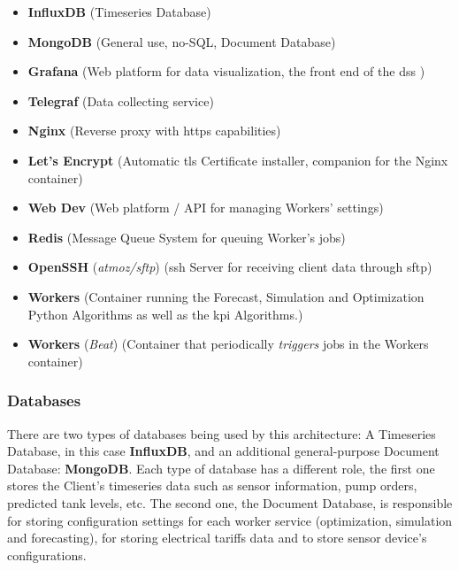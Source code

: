 \begin{itemize}

\item \textbf{InfluxDB} (Timeseries Database)
\item \textbf{MongoDB} (General use, no-SQL, Document Database)
\item \textbf{Grafana} (Web platform for data visualization, the front end of the \gls{dss} \parencite{grafana})
\item \textbf{Telegraf} (Data collecting service)
\item \textbf{Nginx} (Reverse proxy with \gls{https} capabilities)
\item \textbf{Let's Encrypt} (Automatic \gls{tls} Certificate installer, companion for the Nginx container)
\item \textbf{Web Dev} (Web platform / API for managing Workers' settings)
\item \textbf{Redis} (Message Queue System for queuing Worker's jobs)
\item \textbf{OpenSSH} (\textit{atmoz/sftp}) (\gls{ssh} Server for receiving client data through \gls{sftp})
\item \textbf{Workers} (Container running the Forecast, Simulation and Optimization Python Algorithms as well as the \gls{kpi} Algorithms.)
\item \textbf{Workers} (\textit{Beat}) (Container that periodically \textit{triggers} jobs in the Workers container)

\end{itemize}





\subsubsection{Databases}\label{methodology:sss:databases}

There are two types of databases being used by this architecture: A Timeseries Database, in this case \textbf{InfluxDB}, and an additional general-purpose Document Database: \textbf{MongoDB}. Each type of database has a different role, the first one stores the Client's timeseries data such as sensor information, pump orders, predicted tank levels, etc.
The second one, the Document Database, is responsible for storing configuration settings for each worker service (optimization, simulation and forecasting), for storing electrical tariffs data and to store sensor device's configurations.

